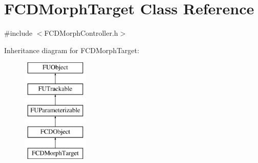 \hypertarget{classFCDMorphTarget}{
\section{FCDMorphTarget Class Reference}
\label{classFCDMorphTarget}
}


{\ttfamily \#include $<$FCDMorphController.h$>$}

Inheritance diagram for FCDMorphTarget:\begin{figure}[H]
\begin{center}
\leavevmode
\includegraphics[height=5.000000cm]{classFCDMorphTarget}
\end{center}
\end{figure}
